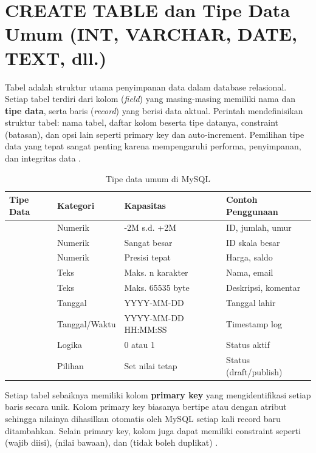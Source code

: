 ﻿\section{CREATE TABLE dan Tipe Data Umum (INT, VARCHAR, DATE, TEXT, dll.)}

Tabel adalah struktur utama penyimpanan data dalam database relasional. Setiap tabel terdiri dari kolom (\textit{field}) yang masing-masing memiliki nama dan \textbf{tipe data}, serta baris (\textit{record}) yang berisi data aktual. Perintah  mendefinisikan struktur tabel: nama tabel, daftar kolom beserta tipe datanya, constraint (batasan), dan opsi lain seperti primary key dan auto-increment. Pemilihan tipe data yang tepat sangat penting karena mempengaruhi performa, penyimpanan, dan integritas data \cite{mysqlDocs}.

\begin{table}[H]
\centering
\begin{tabular}{|P{2.5cm}|P{3cm}|P{3cm}|P{3.5cm}|}
\hline
\textbf{Tipe Data} & \textbf{Kategori} & \textbf{Kapasitas} & \textbf{Contoh Penggunaan} \\
\hline
{} & Numerik & -2M s.d. +2M & ID, jumlah, umur \\
\hline
{} & Numerik & Sangat besar & ID skala besar \\
\hline
{} & Numerik & Presisi tepat & Harga, saldo \\
\hline
{} & Teks & Maks. n karakter & Nama, email \\
\hline
{} & Teks & Maks. 65535 byte & Deskripsi, komentar \\
\hline
{} & Tanggal & YYYY-MM-DD & Tanggal lahir \\
\hline
{} & Tanggal/Waktu & YYYY-MM-DD HH:MM:SS & Timestamp log \\
\hline
{} & Logika & 0 atau 1 & Status aktif \\
\hline
{} & Pilihan & Set nilai tetap & Status (draft/publish) \\
\hline
\end{tabular}
\caption{Tipe data umum di MySQL}
\end{table}

Setiap tabel sebaiknya memiliki kolom \textbf{primary key} yang mengidentifikasi setiap baris secara unik. Kolom primary key biasanya bertipe  atau  dengan atribut  sehingga nilainya dihasilkan otomatis oleh MySQL setiap kali record baru ditambahkan. Selain primary key, kolom juga dapat memiliki constraint seperti  (wajib diisi),  (nilai bawaan), dan  (tidak boleh duplikat) \cite{mysqlGettingStarted}.

